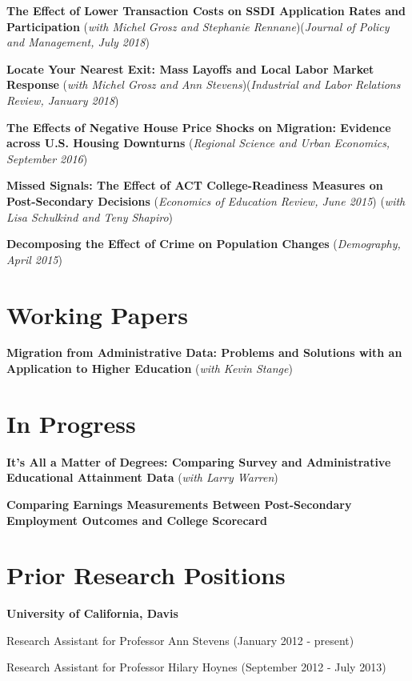 \documentclass[margin,line]{res}
\newenvironment{list1}{
  \begin{list}{\ding{113}}{%
      \setlength{\itemsep}{0in}
      \setlength{\parsep}{0in} \setlength{\parskip}{0in}
      \setlength{\topsep}{0in} \setlength{\partopsep}{0in} 
      \setlength{\leftmargin}{0.17in}}}{\end{list}}
\begin{document}
\begin{resume}
\textbf{The Effect of Lower Transaction Costs on SSDI Application Rates and Participation} (\emph{with Michel Grosz and Stephanie Rennane})(\emph{Journal of Policy and Management, July 2018})

\textbf{Locate Your Nearest Exit: Mass Layoffs and Local Labor Market Response} (\emph{with Michel Grosz and Ann Stevens})(\emph{Industrial and Labor Relations Review, January 2018})

\textbf{The Effects of Negative House Price Shocks on Migration: Evidence across U.S. Housing Downturns} (\textit{Regional Science and Urban Economics, September 2016})

\textbf{Missed Signals: The Effect of ACT College-Readiness Measures on Post-Secondary Decisions} (\textit{Economics of Education Review, June 2015}) (\emph{with Lisa Schulkind and Teny Shapiro})

\textbf{Decomposing the Effect of Crime on Population Changes} (\textit{Demography, April 2015})\\

\section{\sc Working Papers}

\textbf{Migration from Administrative Data: Problems and Solutions with an Application to Higher Education} (\emph{with Kevin Stange})

\section{\sc In Progress}

\textbf{It's All a Matter of Degrees: Comparing Survey and Administrative Educational Attainment Data} (\emph{with Larry Warren})

\textbf{Comparing Earnings Measurements Between Post-Secondary Employment Outcomes and College Scorecard}


%
\section{\sc Prior Research Positions}
\textbf{University of California, Davis}
\begin{list1}
	\item[] Research Assistant for Professor Ann Stevens (January 2012 - present)
	\item[] Research Assistant for Professor Hilary Hoynes (September 2012 - July 2013)
\end{list1}
\vspace*{-.1in}


\end{resume}
\end{document}
